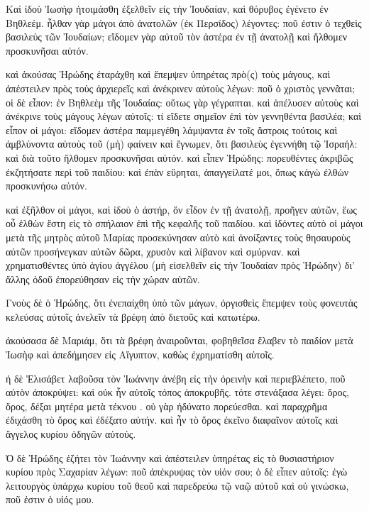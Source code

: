 \pend\pstart
{}

\pend\setcounter{pstartL}{1}\pstart
Καὶ ἰδοὺ Ἰωσὴφ ἡτοιμάσθη ἐξελθεῖν εἰς τὴν Ἰουδαίαν, καὶ θόρυβος ἐγένετο ἐν Βηθλεέμ. ἦλθαν γὰρ μάγοι ἀπὸ ἀνατολῶν (ἐκ Περσίδος) λέγοντες: ποῦ ἐστιν ὁ τεχθεὶς βασιλεὺς τῶν Ἰουδαίων; εἴδομεν γὰρ αὐτοῦ τὸν ἀστέρα ἐν τῇ ἀνατολῇ καὶ ἤλθομεν προσκυνῆσαι αὐτόν.

\pend\pstart
καὶ ἀκούσας Ἡρώδης ἐταράχθη καὶ ἔπεμψεν ὑπηρέτας πρὸ(ς) τοὺς μάγους, καὶ ἀπέστειλεν πρὸς τοὺς ἀρχιερεῖς καὶ ἀνέκρινεν αὐτοὺς λέγων: ποῦ ὁ χριστὸς γεννᾶται; οἱ δὲ εἶπον: ἐν Βηθλεὲμ τῆς Ἰουδαίας: οὕτως γὰρ γέγραπται. καὶ ἀπέλυσεν αὐτοὺς καὶ ἀνέκρινε τοὺς μάγους λέγων αὐτοῖς: τί εἴδετε σημεῖον ἐπὶ τὸν γεννηθέντα βασιλέα; καὶ εἶπον οἱ μάγοι: εἴδομεν ἀστέρα παμμεγέθη λάμψαντα ἐν τοῖς ἄστροις τούτοις καὶ ἀμβλύνοντα αὐτοὺς τοῦ (μὴ) φαίνειν καὶ ἔγνωμεν, ὅτι βασιλεὺς ἐγεννήθη τῷ Ἰσραήλ: καὶ διὰ τοῦτο ἤλθομεν προσκυνῆσαι αὐτόν. καὶ εἶπεν Ἡρώδης: πορευθέντες ἀκριβῶς ἐκζητήσατε περὶ τοῦ παιδίου: καὶ ἐπὰν εὕρηται, ἀπαγγείλατέ μοι, ὅπως κἀγὼ ἐλθὼν προσκυνήσω αὐτόν.

\pend\pstart
καὶ ἐξῆλθον οἱ μάγοι, καὶ ἰδοὺ ὁ ἀστήρ, ὅν εἶδον ἐν τῇ ἀνατολῇ, προῆγεν αὐτῶν, ἕως οὗ ἐλθὼν ἔστη εἰς τὸ σπήλαιον ἐπὶ τῆς κεφαλῆς τοῦ παιδίου. καὶ ἰδόντες αὐτὸ οἱ μάγοι μετὰ τῆς μητρὸς αὐτοῦ Μαρίας προσεκύνησαν αὐτὸ καὶ ἀνοίξαντες τοὺς θησαυροὺς αὐτῶν προσήνεγκαν αὐτῶν δῶρα, χρυσὸν καὶ λίβανον καὶ σμύρναν. καὶ χρηματισθέντες ὑπὸ ἁγίου ἀγγέλου (μὴ εἰσελθεῖν εἰς τὴν Ἰουδαίαν πρὸς Ἡρώδην) δι' ἄλλης ὁδοῦ ἐπορεύθησαν εἰς τὴν χώραν αὐτῶν.

\pend\pstart
{}

\pend\setcounter{pstartL}{1}\pstart
Γνοὺς δὲ ὁ Ἡρώδης, ὅτι ἐνεπαίχθη ὑπὸ τῶν μάγων, ὀργισθεὶς ἔπεμψεν τοὺς φονευτὰς κελεύσας αὐτοῖς ἀνελεῖν τὰ βρέφη ἀπὸ διετοῦς καὶ κατωτέρω.

\pend\pstart
ἀκούσασα δὲ Μαριάμ, ὅτι τὰ βρέφη ἀναιροῦνται, φοβηθεῖσα ἔλαβεν τὸ παιδίον μετὰ Ἰωσὴφ καὶ ἀπεδήμησεν εἰς Αἴγυπτον, καθὼς ἐχρηματίσθη αὐτοῖς.

\pend\pstart
ἡ δὲ Ἐλισάβετ λαβοῦσα τὸν Ἰωάννην ἀνέβη εἰς τὴν ὀρεινὴν καὶ περιεβλέπετο, ποῦ αὐτὸν ἀποκρύψει: καὶ οὐκ ἦν αὐτοῖς τόπος ἀποκρυβῆς. τότε στενάξασα λέγει: ὄρος, ὄρος, δέξαι μητέρα μετὰ τέκνου . οὐ γὰρ ἠδύνατο πορεύεσθαι. καὶ παραχρῆμα ἐδιχάσθη τὸ ὄρος καὶ ἐδέξατο αὐτήν. καὶ ἦν τὸ ὄρος ἐκεῖνο διαφαῖνον αὐτοῖς καὶ ἄγγελος κυρίου ὁδηγῶν αὐτούς.

\pend\pstart
{}

\pend\setcounter{pstartL}{1}\pstart
Ὁ δὲ Ἡρώδης ἐζήτει τὸν Ἰωάννην καὶ ἀπέστειλεν ὑπηρέτας εἰς τὸ θυσιαστήριον κυρίου πρὸς Σαχαρίαν λέγων: ποῦ ἀπέκρυψας τὸν υἱόν σου; ὁ δὲ εἶπεν αὐτοῖς: ἐγὼ λειτουργὸς ὑπάρχω κυρίου τοῦ θεοῦ καὶ παρεδρεύω τῷ ναῷ αὐτοῦ καὶ οὐ γινώσκω, ποῦ ἐστιν ὁ υἱός μου.

